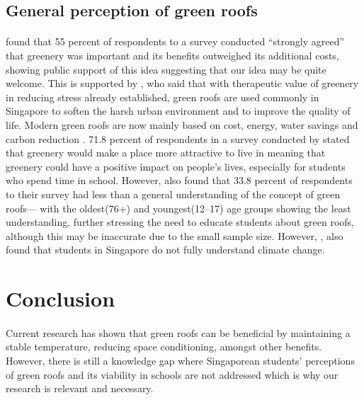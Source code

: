 \documentclass{article}
\begin{document}
\begin{multicols}{2}
  \subsection{General perception of green roofs}
  \paragraph{} \cite{CommAwareGBSyd} found that 55 percent of respondents
  to a survey conducted “strongly agreed” that greenery was important
  and its benefits outweighed its additional costs, showing public support
  of this idea suggesting that our idea may be quite welcome. This is
  supported by \cite{CFGRSG}, who said that with therapeutic value of
  greenery in reducing stress already established, green roofs are used
  commonly in Singapore to soften the harsh urban environment and to
  improve the quality of life. Modern green roofs are now mainly based on
  cost, energy, water savings and carbon reduction \cite{CFGRSG}.  71.8
  percent of respondents in a survey conducted by \cite{CommAwareGBSyd}
  stated that greenery would make a place more attractive to live in
  meaning that greenery could have a positive impact on people’s
  lives, especially for students who spend time in school. However,
  \cite{GRBuildEnSave} also found that 33.8 percent of respondents to
  their survey had less than a general understanding of the concept of
  green roofs--- with the oldest(76+) and youngest(12--17) age groups
  showing the least understanding, further stressing the need to educate
  students about green roofs, although this may be inaccurate due to
  the small sample size. However, \cite{student_carbon_footprint}, also
  found that students in Singapore do not fully understand climate change.



  \section{Conclusion}
  \paragraph{} Current research has shown that green roofs can be
  beneficial by maintaining a stable temperature, reducing space
  conditioning, amongst other benefits. However, there is still
  a knowledge gap where Singaporean students' perceptions of green
  roofs and its viability in schools are not addressed which is why our
  research is relevant and necessary.

\end{multicols}
\end{document}
